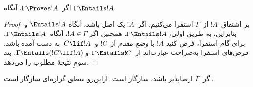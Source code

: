 \documentclass[../../../include/open-logic-section]{subfiles}
\begin{document}


\begin{thm}[درستی] 
اگر~$\Gamma\Proves!A$، آنگاه
$\Gamma \Entails !A$. 
\end{thm}

\begin{proof} 
بر اشتقاق~$!A$ از~$\Gamma$ استقرا می‌کنیم. اگر~$!A$ یک اصل باشد، آنگاه
$\Entails !A$ و بنابراین، به طریق اولی، $\Gamma \Entails!A$. همچنین اگر
$!A \in \Gamma$، آنگاه~$\Gamma \Entails!A$. برای گام استقرا، فرض کنید
$!A$ با \emph{وضع مقدم} از~$!C$ و~$!C\lif!A$ به دست آمده باشد. فرض‌های
استقرا به‌صراحت عبارت‌اند از~$\Gamma\Entails !C$ و
$\Gamma\Entails (!C\lif !A)$. بند سومِ
 نتیجهٔ مطلوب را می‌دهد. 
\end{proof}

\begin{cor} 
اگر~$\Gamma$ ارضاپذیر باشد، سازگار است. ازاین‌رو منطق گزاره‌ای سازگار است. 
\end{cor}
\end{document}

